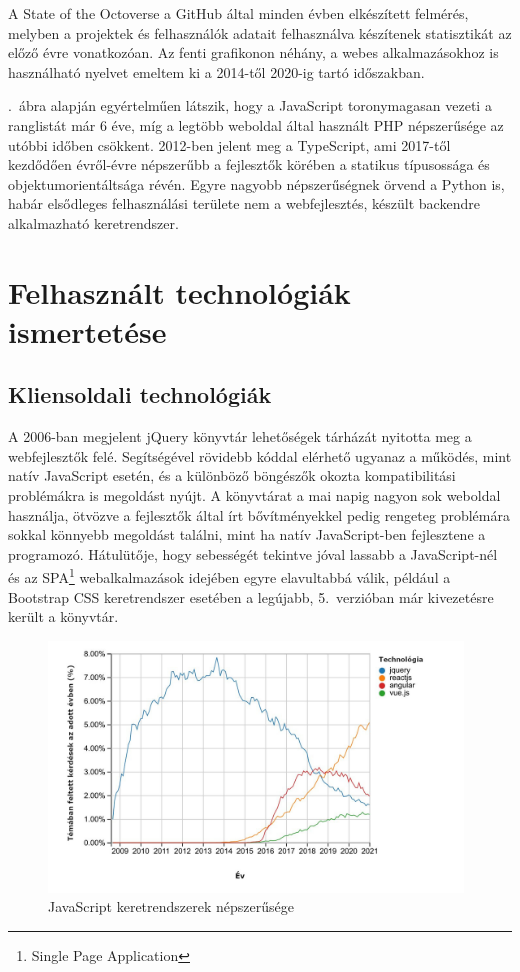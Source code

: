 \documentclass[
]{thesis-ekf}
\theoremstyle{definition}
\theoremstyle{remark}
\begin{document}
	A State of the Octoverse\cite{octoverse} a GitHub által minden évben elkészített felmérés, melyben a projektek és felhasználók adatait felhasználva készítenek statisztikát az előző évre vonatkozóan. Az fenti grafikonon néhány, a webes alkalmazásokhoz is használható nyelvet emeltem ki a 2014-től 2020-ig tartó időszakban.
	
	\Az{\ref{fig:ranglista}}.~ábra alapján egyértelműen látszik, hogy a JavaScript toronymagasan vezeti a ranglistát már 6 éve, míg a legtöbb weboldal által használt PHP népszerűsége az utóbbi időben csökkent. 2012-ben jelent meg a TypeScript, ami 2017-től kezdődően évről-évre népszerűbb a fejlesztők körében a statikus típusossága és objektumorientáltsága révén. Egyre nagyobb népszerűségnek örvend a Python is, habár elsődleges felhasználási területe nem a webfejlesztés, készült backendre alkalmazható keretrendszer.
	
	\chapter{Felhasznált technológiák ismertetése}
	\section{Kliensoldali technológiák}
	A 2006-ban megjelent jQuery\cite{jquery} könyvtár lehetőségek tárházát nyitotta meg a webfejlesztők felé. Segítségével rövidebb kóddal elérhető ugyanaz a működés, mint natív JavaScript esetén, és a különböző böngészők okozta kompatibilitási problémákra is megoldást nyújt. A könyvtárat a mai napig nagyon sok weboldal használja, ötvözve a fejlesztők által írt bővítményekkel pedig rengeteg problémára sokkal könnyebb megoldást találni, mint ha natív JavaScript-ben fejlesztene a programozó. Hátulütője, hogy sebességét tekintve jóval lassabb a JavaScript-nél és az SPA\footnote{Single Page Application} webalkalmazások idejében egyre elavultabbá válik, például a Bootstrap CSS keretrendszer esetében a legújabb, 5.~verzióban már kivezetésre került a könyvtár.
	
	\begin{figure}[!h]
		\centering
		\includegraphics[width=11cm]{kepek/stackoverflow_js_trends_2021_magyar.jpg}
		\caption{JavaScript keretrendszerek népszerűsége\cite{stackoverflow_trends}}
		\label{fig:stackoverflow_trends}
	\end{figure}
\end{document}
